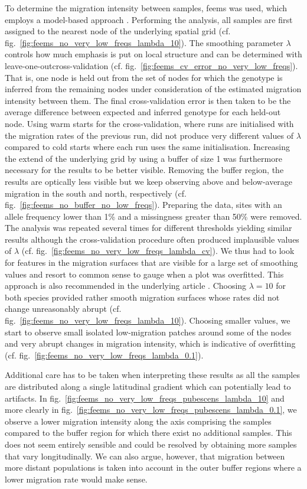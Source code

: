 \documentclass[hidelinks,11pt]{article}
\begin{document}
{    To determine the migration intensity between samples, \acrshort{feems} was used, which employs a model-based approach \cite{feems}. Performing the analysis, all samples are first assigned to the nearest node of the underlying spatial grid (cf. fig.~\ref{fig:feems_no_very_low_freqs_lambda_10}). The smoothing parameter $\lambda$ controls how much emphasis is put on local structure and can be determined with leave-one-outcross-validation (cf. fig.~\ref{fig:feems_cv_error_no_very_low_freqs}). That is, one node is held out from the set of nodes for which the genotype is inferred from the remaining nodes under consideration of the estimated migration intensity between them. The final cross-validation error is then taken to be the average difference between expected and inferred genotype for each held-out node. Using warm starts for the cross-validation, where runs are initialised with the migration rates of the previous run, did not produce very different values of $\lambda$ compared to cold starts where each run uses the same initialisation. Increasing the extend of the underlying grid by using a buffer of size 1 was furthermore necessary for the results to be better visible. Removing the buffer region, the results are optically less visible but we keep observing above and below-average migration in the south and north, respectively (cf. fig.~\ref{fig:feems_no_buffer_no_low_freqs}). Preparing the data, sites with an allele frequency lower than 1\% and a missingness greater than 50\% were removed. The analysis was repeated several times for different thresholds yielding similar results although the cross-validation procedure often produced implausible values of $\lambda$ (cf. fig.~\ref{fig:feems_no_very_low_freqs_lambda_cv}}). We thus had to look for features in the migration surfaces that are visible for a large set of smoothing values and resort to common sense to gauge when a plot was overfitted. This approach is also recommended in the underlying article \cite{feems}. Choosing  $\lambda=10$ for both species provided rather smooth migration surfaces whose rates did not change unreasonably abrupt (cf. fig.~\ref{fig:feems_no_very_low_freqs_lambda_10}). Choosing smaller values, we start to observe small isolated low-migration patches around some of the nodes and very abrupt changes in migration intensity, which is indicative of overfitting (cf. fig.~\ref{fig:feems_no_very_low_freqs_lambda_0.1}).

    Additional care has to be taken when interpreting these results as all the samples are distributed along a single latitudinal gradient which can potentially lead to artifacts. In fig.~\ref{fig:feems_no_very_low_freqs_pubescens_lambda_10} and more clearly in fig.~\ref{fig:feems_no_very_low_freqs_pubescens_lambda_0.1}, we observe a lower migration intensity along the axis comprising the samples compared to the buffer region for which there exist no additional samples. This does not seem entirely sensible and could be resolved by obtaining more samples that vary longitudinally. We can also argue, however, that migration between more distant populations is taken into account in the outer buffer regions where a lower migration rate would make sense.
\end{document}
